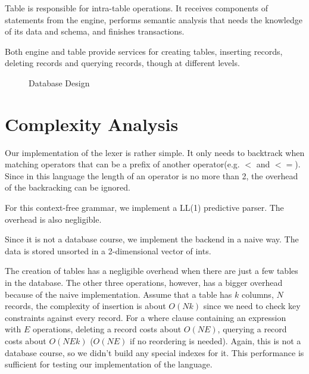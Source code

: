 \documentclass{article}
\begin{document}
Table is responsible for intra-table operations. It receives components of statements from the engine, performs semantic analysis that needs the knowledge of its data and schema, and finishes transactions.

Both engine and table provide services for creating tables, inserting records, deleting records and querying records, though at different levels.

\begin{figure}[H]
\centering
{}
\caption{Database Design}
\label{fig:db}
\end{figure}

\section{Complexity Analysis}

Our implementation of the lexer is rather simple. It only needs to backtrack when matching operators that can be a prefix of another operator(e.g. $<$ and $<=$). Since in this language the length of an operator is no more than 2, the overhead of the backracking can be ignored.

For this context-free grammar, we implement a LL(1) predictive parser. The overhead is also negligible.

Since it is not a database course, we implement the backend in a naive way. The data is stored unsorted in a 2-dimensional vector of ints.

The creation of tables has a negligible overhead when there are just a few tables in the database. The other three operations, however, has a bigger overhead because of the naive implementation. Assume that a table has $k$ columns, $N$ records, the complexity of insertion is about $O(Nk)$ since we need to check key constraints against every record. For a where clause containing an expression with $E$ operations, deleting a record costs about $O(NE)$, querying a record costs about $O(NEk)$ ($O(NE)$ if no reordering is needed). Again, this is not a database course, so we didn't build any special indexes for it. This performance is sufficient for testing our implementation of the language.
\end{document}
